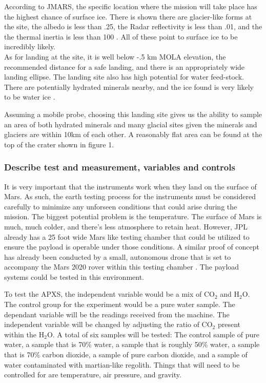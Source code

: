 \documentclass[%
 portrait,
 aapm,
 mph,%
 amsmath,amssymb,
 reprint,%
]{revtex4-2}
\begin{document}
According to JMARS, the specific location where the mission will take place has the highest chance of surface ice. There is shown there are glacier-like forms at the site, the albedo is less than .25, the Radar reflectivity is less than .01, and the the thermal inertia is less than 100 \cite{christensen_engle_anwar_dickenshied_noss_gorelick_weiss-malik_2019}. All of these point to surface ice to be incredibly likely. 
\\
As for landing at the site, it is well below -.5 km MOLA elevation, the recommended distance for a safe landing, and there is an appropriately wide landing ellipse. The landing site also has high potential for water feed-stock. There are potentially hydrated minerals nearby, and the ice found is very likely to be water ice \cite{christensen_engle_anwar_dickenshied_noss_gorelick_weiss-malik_2019}. 

Assuming a mobile probe, choosing this landing site gives us the ability to sample an area of both hydrated minerals and many glacial sites given the minerals and glaciers are within 10km of each other. A reasonably flat area can be found at the top of the crater shown in figure 1.

\subsubsection{Describe test and measurement, variables and controls}
It is very important that the instruments work when they land on the surface of Mars. As such, the earth testing process for the instruments must be considered carefully to minimize any unforseen conditions that could arise during the mission. The biggest potential problem is the temperature. The surface of Mars is much, much colder, and there's less atmosphere to retain heat. However, JPL already has a 25 foot wide Mars like testing chamber that could be utilized to ensure the payload is operable under those conditions. A similar proof of concept has already been conducted by a small, autonomous drone that is set to accompany the Mars 2020 rover within this testing chamber \cite{banke_2019}. The payload systems could be tested in this environment. 

To test the APXS, the independent variable would be a mix of CO\begin{math} _2 \end{math} and H\begin{math} _2 \end{math}O. The control group for the experiment would be a pure water sample. The dependant variable will be the readings received from the machine. The independent variable will be changed by adjusting the ratio of CO\begin{math} _2 \end{math} present within the H\begin{math} _2 \end{math}O. A total of six samples will be tested: The control sample of pure water, a sample that is 70\% water, a sample that is roughly 50\% water, a sample that is 70\% carbon dioxide, a sample of pure carbon dioxide, and a sample of water contaminated with martian-like regolith. Things that will need to be controlled for are temperature, air pressure, and gravity. 
\end{document}

